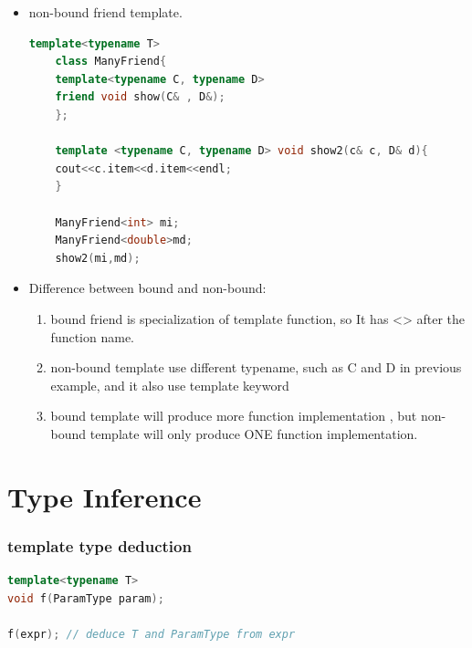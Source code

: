 \documentclass[a4paper,12pt,twoside]{book}
\begin{document}
\begin{itemize}
	\item non-bound friend template.
	\begin{lstlisting}[frame=single, language=c++]
	template<typename T>
	class ManyFriend{
	template<typename C, typename D>
	friend void show(C& , D&);
	};
	
	template <typename C, typename D> void show2(c& c, D& d){
	cout<<c.item<<d.item<<endl;
	}
	
	ManyFriend<int> mi;
	ManyFriend<double>md;
	show2(mi,md);
	\end{lstlisting}
	
	\item Difference between bound and non-bound:
	
	\begin{enumerate}
		\item bound friend is specialization of template function, so It has <> after the function name.
		
		\item non-bound template use different typename, such as C and D in previous example, and it also use template keyword
		
		\item bound template will produce more function implementation , but non-bound template will only produce ONE function implementation.
	\end{enumerate}

\end{itemize}
\section{Type Inference}


\subsubsection{template type deduction}

\begin{lstlisting}[frame=single, language=c++]
template<typename T>
void f(ParamType param);

f(expr); // deduce T and ParamType from expr
\end{lstlisting}
\end{document}
